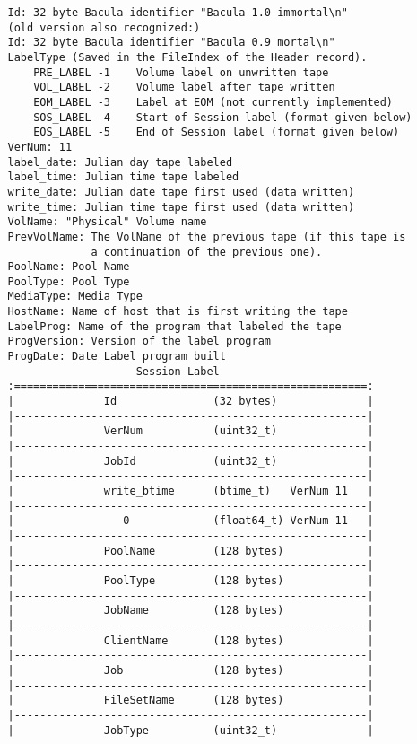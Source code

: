 \begin{verbatim}
   Id: 32 byte Bacula identifier "Bacula 1.0 immortal\n"
   (old version also recognized:)
   Id: 32 byte Bacula identifier "Bacula 0.9 mortal\n"
   LabelType (Saved in the FileIndex of the Header record).
       PRE_LABEL -1    Volume label on unwritten tape
       VOL_LABEL -2    Volume label after tape written
       EOM_LABEL -3    Label at EOM (not currently implemented)
       SOS_LABEL -4    Start of Session label (format given below)
       EOS_LABEL -5    End of Session label (format given below)
   VerNum: 11
   label_date: Julian day tape labeled
   label_time: Julian time tape labeled
   write_date: Julian date tape first used (data written)
   write_time: Julian time tape first used (data written)
   VolName: "Physical" Volume name
   PrevVolName: The VolName of the previous tape (if this tape is
                a continuation of the previous one).
   PoolName: Pool Name
   PoolType: Pool Type
   MediaType: Media Type
   HostName: Name of host that is first writing the tape
   LabelProg: Name of the program that labeled the tape
   ProgVersion: Version of the label program
   ProgDate: Date Label program built
                       Session Label
   :=======================================================:
   |              Id               (32 bytes)              |
   |-------------------------------------------------------|
   |              VerNum           (uint32_t)              |
   |-------------------------------------------------------|
   |              JobId            (uint32_t)              |
   |-------------------------------------------------------|
   |              write_btime      (btime_t)   VerNum 11   |
   |-------------------------------------------------------|
   |                 0             (float64_t) VerNum 11   |
   |-------------------------------------------------------|
   |              PoolName         (128 bytes)             |
   |-------------------------------------------------------|
   |              PoolType         (128 bytes)             |
   |-------------------------------------------------------|
   |              JobName          (128 bytes)             |
   |-------------------------------------------------------|
   |              ClientName       (128 bytes)             |
   |-------------------------------------------------------|
   |              Job              (128 bytes)             |
   |-------------------------------------------------------|
   |              FileSetName      (128 bytes)             |
   |-------------------------------------------------------|
   |              JobType          (uint32_t)              |

\end{verbatim}

